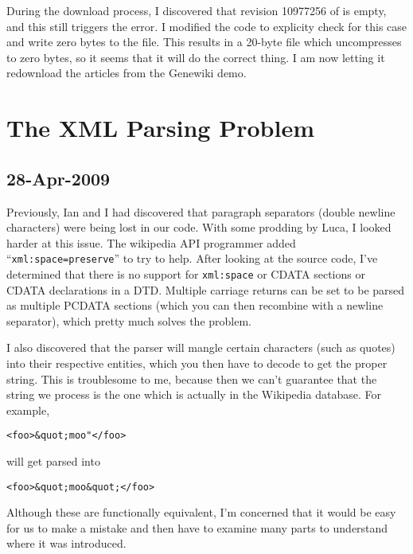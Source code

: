 During the download process, I discovered that revision 10977256 of
 is empty, and this still triggers the 
error.
I modified the code to explicity check for this case and write
zero bytes to the file.  This results in a 20-byte file which
uncompresses to zero bytes, so it seems that it will do the
correct thing.
I am now letting it redownload the articles from the Genewiki demo.

\section{The XML Parsing Problem}
\label{sec:up2date-xml}

\subsection{28-Apr-2009}

Previously, Ian and I had discovered that paragraph separators
(double newline characters) were being lost in our code.
With some prodding by Luca, I looked harder at this issue.
The wikipedia API programmer added ``\texttt{xml:space=preserve}''
to try to help.
After looking at the  source code, I've
determined that there is no support for \texttt{xml:space}
or CDATA sections or CDATA declarations in a DTD.
Multiple carriage returns can be set to be parsed as multiple
PCDATA sections (which you can then recombine with a newline
separator), which pretty much solves the problem.

I also discovered that the parser will mangle certain characters
(such as quotes) into their respective entities, which you
then have to decode to get the proper string.
This is troublesome to me, because then we can't guarantee
that the string we process is the one which is actually in
the Wikipedia database.  For example,
\begin{verbatim}
<foo>&quot;moo"</foo>
\end{verbatim}
will get parsed into
\begin{verbatim}
<foo>&quot;moo&quot;</foo>
\end{verbatim}
Although these are functionally equivalent, I'm concerned that
it would be easy for us to make a mistake and then have to
examine many parts to understand where it was introduced.

